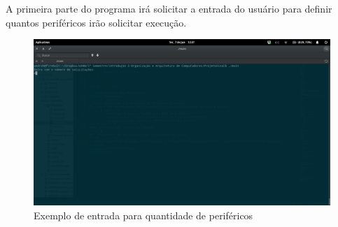 \documentclass[12pt, oneside,a4paper, brazil]{abntex2}
\begin{document}
A primeira parte do programa irá solicitar a entrada do usuário para definir quantos periféricos irão solicitar execução. 
\begin{figure}[!htb]
\centering
\includegraphics[scale=0.3]{img1.png}
\caption{Exemplo de entrada para quantidade de periféricos}
\label{Gráfico 1}
\end{figure}
\end{document}
